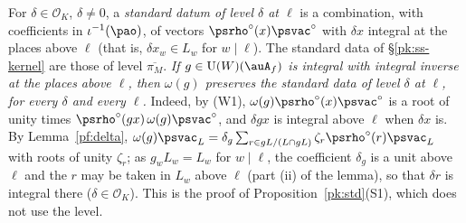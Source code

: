 \documentclass[10pt]{amsart}
\theoremstyle{definition}
\theoremstyle{remark}
\providecommand{\auO}{\mathcal O}
\providecommand{\auU}{\mathrm U}
\providecommand{\aubar}[1]{\overline{#1}}
\begin{document}
For $\delta\in\auO_K$, $\delta\ne0$, a \emph{standard datum of level $\delta$ at $\ell$} is a
combination, with coefficients in $\iota^{-1}(\pao)$, of vectors $\psrho^\circ(x)\psvac^\circ$ with
$\delta x$ integral at the places above $\ell$ (that is, $\delta x_w\in L_w$ for $w\mid\ell$). The
standard data of \S\ref{pk:ss-kernel} are those of level $\aubar{\pi_M}$. \emph{If $g\in\auU(W)(\auA_f)$ is integral with integral inverse at the places above $\ell$, then
$\omega(g)$ preserves the standard data of level $\delta$ at $\ell$, for every $\delta$ and every $\ell$.}
Indeed, by (W1), $\omega(g)\psrho^\circ(x)\psvac^\circ$ is a root of unity times $\psrho^\circ(gx)\,
\omega(g)\psvac^\circ$, and $\delta gx$ is integral above $\ell$ when $\delta x$ is. By Lemma~\ref{pf:delta},
$\omega(g)\psvac_L=\delta_g\sum_{r\in gL/(L\cap gL)}\zeta_r\psrho^\circ(r)\psvac_L$ with roots of unity
$\zeta_r$; as $g_w L_w=L_w$ for $w\mid\ell$, the coefficient $\delta_g$ is a unit above $\ell$ and the $r$ may be taken in $L_w$ above
$\ell$ (part (ii) of the lemma), so that $\delta r$ is integral there ($\delta\in\auO_K$). This is the proof of
Proposition~\ref{pk:std}(S1), which does not use the level.
\end{document}
